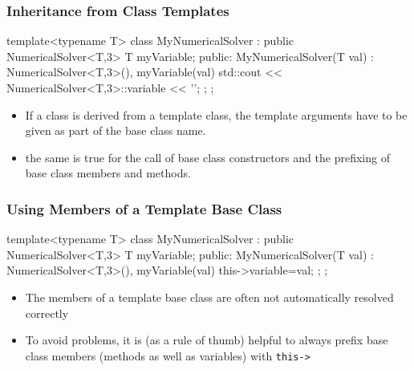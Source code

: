 \documentclass[aspectratio=169,ignorenonframetext,11pt]{beamer}
\def\inline{\lstinline[basicstyle=\small\ttfamily]}
\begin{document}

\begin{frame}[fragile]
\frametitle{Inheritance from Class Templates}
\begin{cppcode}
template<typename T>
class MyNumericalSolver : public NumericalSolver<T,3> {
    T myVariable;
  public:
    MyNumericalSolver(T val) : NumericalSolver<T,3>(),
                               myVariable(val)
    {
      std::cout << NumericalSolver<T,3>::variable
                << '\n';
    };
};
\end{cppcode}
\begin{itemize}%
\item If a class is derived from a template class, the template arguments have to be given as
part of the base class name.
\item the same is true for the call of base class constructors and the prefixing
of base class members and methods.
\end{itemize}

\end{frame}



\begin{frame}[fragile]
\frametitle{Using Members of a Template Base Class}
\begin{cppcode}
template<typename T>
class MyNumericalSolver : public NumericalSolver<T,3> {
    T myVariable;
  public:
    MyNumericalSolver(T val) : NumericalSolver<T,3>(),
                               myVariable(val)
    {
        this->variable=val;
    };
};
\end{cppcode}
\begin{itemize}
\item The members of a template base class are often not automatically resolved correctly
\item To avoid problems, it is (as a rule of thumb) helpful to always prefix
base class members (methods as well as variables) with \inline!this->!
\end{itemize}

\end{frame}


\end{document}
